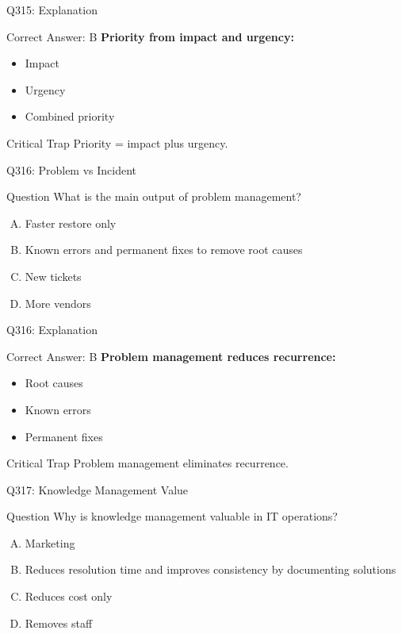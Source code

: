 \documentclass{beamer}
\begin{document}
	\begin{frame}{Q315: Explanation}
		\begin{block}{Correct Answer: B}
			\textbf{Priority from impact and urgency:}
			\begin{itemize}
				\item Impact
				\item Urgency
				\item Combined priority
			\end{itemize}
		\end{block}
		\begin{alertblock}{Critical Trap}
			Priority = impact plus urgency.
		\end{alertblock}
	\end{frame}
	
	\begin{frame}{Q316: Problem vs Incident}
		\begin{block}{Question}
			What is the main output of problem management?
		\end{block}
		\begin{enumerate}[(A)]
			\item Faster restore only
			\item Known errors and permanent fixes to remove root causes
			\item New tickets
			\item More vendors
		\end{enumerate}
	\end{frame}
	
	\begin{frame}{Q316: Explanation}
		\begin{block}{Correct Answer: B}
			\textbf{Problem management reduces recurrence:}
			\begin{itemize}
				\item Root causes
				\item Known errors
				\item Permanent fixes
			\end{itemize}
		\end{block}
		\begin{alertblock}{Critical Trap}
			Problem management eliminates recurrence.
		\end{alertblock}
	\end{frame}
	
	\begin{frame}{Q317: Knowledge Management Value}
		\begin{block}{Question}
			Why is knowledge management valuable in IT operations?
		\end{block}
		\begin{enumerate}[(A)]
			\item Marketing
			\item Reduces resolution time and improves consistency by documenting solutions
			\item Reduces cost only
			\item Removes staff
		\end{enumerate}
	\end{frame}
	
\end{document}
